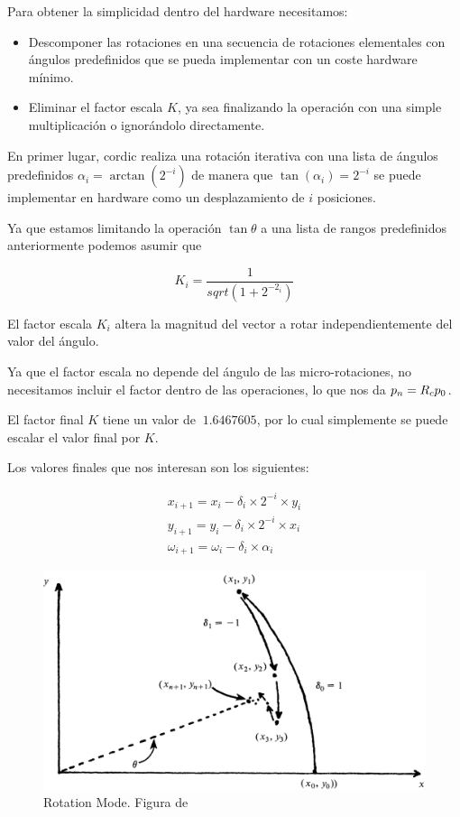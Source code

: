 Para obtener la simplicidad dentro del hardware necesitamos:

\begin{itemize}
	\item Descomponer las rotaciones en una secuencia de rotaciones elementales con ángulos predefinidos que se pueda implementar con un coste hardware mínimo.
	\item Eliminar el factor escala $K$, ya sea finalizando la operación con una simple multiplicación o ignorándolo directamente.
\end{itemize}

En primer lugar, \gls{cordic} realiza una rotación iterativa con una lista de ángulos predefinidos $\alpha_{i} = \arctan({2^{-i}})$ de manera que $\tan({\alpha_{i}}) = 2^{-i}$ se puede implementar en hardware como un desplazamiento de $i$ posiciones.

Ya que estamos limitando la operación $\tan{\theta}$ a una lista de rangos predefinidos anteriormente podemos asumir que

\[
	K_{i} = \frac{1}{sqrt{(1+2^{-2_{i}})}}
\]

El factor escala $K_{i}$ altera la magnitud del vector a rotar independientemente del valor del ángulo. 

Ya que el factor escala no depende del ángulo de las micro-rotaciones, no necesitamos incluir el factor dentro de las operaciones, lo que nos da $\boldmath{p_{n} = R_{c}p_{0}}$.

El factor final $K$ tiene un valor de $~1.6467605$, por lo cual simplemente se puede escalar el valor final por $K$.

Los valores finales que nos interesan son los siguientes:

\[
\begin{matrix}
	x_{i+1} = x_{i} - \delta_{i} \times 2^{-i} \times y_{i} \\
	y_{i+1} = y_{i} - \delta_{i} \times 2^{-i} \times x_{i} \\
	\omega_{i+1} =  \omega_{i} - \delta_{i} \times \alpha_{i}
\end{matrix}
\]

\begin{figure}[ht]
	\centering
	\includegraphics[width=\textwidth]{archivos/CORDIC/RotationMode.png}
	\caption{Rotation Mode. Figura de \cite{schelin_calculator_1983}}
	\label{graf:RM}
\end{figure}

